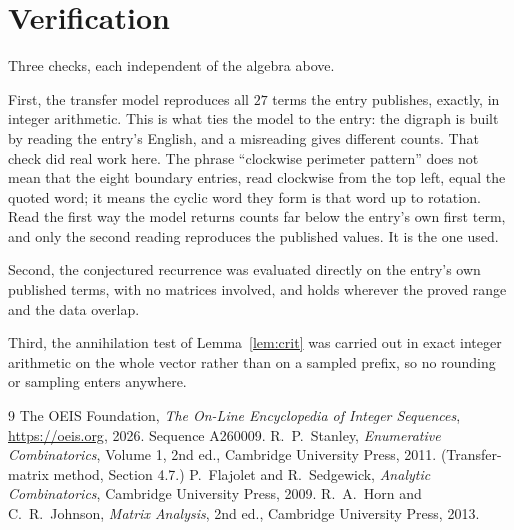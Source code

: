 \documentclass[11pt,a4paper]{article}
\theoremstyle{plain}
\theoremstyle{definition}
\begin{document}
\section{Verification}

Three checks, each independent of the algebra above.

First, the transfer model reproduces all $27$ terms the entry publishes, exactly, in
integer arithmetic. This is what ties the model to the entry: the digraph is built by reading
the entry's English, and a misreading gives different counts. That check did real work here. The phrase ``clockwise perimeter pattern'' does not mean that the eight boundary entries, read clockwise from the top left, equal the quoted word; it means the cyclic word they form is that word up to rotation. Read the first way the model returns counts far below the entry's own first term, and only the second reading reproduces the published values. It is the one used.

Second, the conjectured recurrence was evaluated directly on the entry's own published terms,
with no matrices involved, and holds wherever the proved range and the data overlap.

Third, the annihilation test of Lemma~\ref{lem:crit} was carried out in exact integer
arithmetic on the whole vector rather than on a sampled prefix, so no rounding or sampling
enters anywhere.

\begin{thebibliography}{9}
 The OEIS Foundation, \emph{The On-Line Encyclopedia of Integer
Sequences}, \url{https://oeis.org}, 2026. Sequence A260009.
 R.~P.~Stanley, \emph{Enumerative Combinatorics}, Volume 1, 2nd ed.,
Cambridge University Press, 2011. (Transfer-matrix method, Section 4.7.)
 P.~Flajolet and R.~Sedgewick, \emph{Analytic Combinatorics}, Cambridge
University Press, 2009.
 R.~A.~Horn and C.~R.~Johnson, \emph{Matrix Analysis}, 2nd ed., Cambridge
University Press, 2013.
\end{thebibliography}
\end{document}
